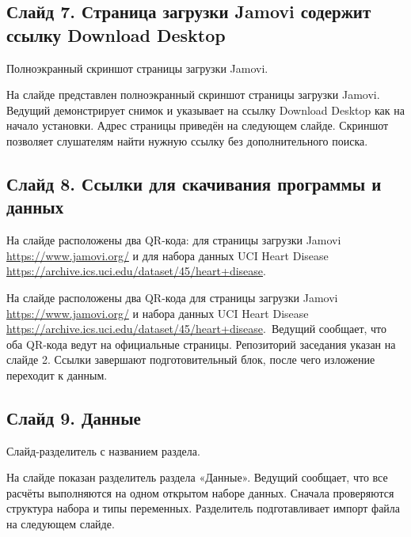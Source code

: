 \documentclass[11pt,a4paper]{article}
\begin{document}
\subsection*{Слайд 7. Страница загрузки Jamovi содержит ссылку Download Desktop}
\begin{onslide}
Полноэкранный скриншот страницы загрузки Jamovi.
\end{onslide}
На слайде представлен полноэкранный скриншот страницы загрузки Jamovi. Ведущий демонстрирует снимок и указывает на ссылку Download Desktop как на начало установки. Адрес страницы приведён на следующем слайде. Скриншот позволяет слушателям найти нужную ссылку без дополнительного поиска.

\subsection*{Слайд 8. Ссылки для скачивания программы и данных}
\begin{onslide}
На слайде расположены два QR-кода: для страницы загрузки Jamovi \url{https://www.jamovi.org/} и для набора данных UCI Heart Disease \url{https://archive.ics.uci.edu/dataset/45/heart+disease}.
\end{onslide}
{\small На слайде расположены два QR-кода для страницы загрузки Jamovi \url{https://www.jamovi.org/} и набора данных UCI Heart Disease \url{https://archive.ics.uci.edu/dataset/45/heart+disease}.\
Ведущий сообщает, что оба QR-кода ведут на официальные страницы. Репозиторий заседания указан на слайде 2. Ссылки завершают подготовительный блок, после чего изложение переходит к данным.}

\subsection*{Слайд 9. Данные}
\begin{onslide}
Слайд-разделитель с названием раздела.
\end{onslide}
На слайде показан разделитель раздела «Данные». Ведущий сообщает, что все расчёты выполняются на одном открытом наборе данных. Сначала проверяются структура набора и типы переменных. Разделитель подготавливает импорт файла на следующем слайде.
\end{document}
